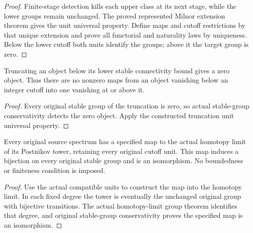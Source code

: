 \begin{proof}
  Finite-stage detection kills each upper class at its next stage, while the lower groups remain unchanged. The proved represented Milnor extension theorem gives the unit universal property. Define maps and cutoff restrictions by that unique extension and prove all functorial and naturality laws by uniqueness. Below the lower cutoff both units identify the groups; above it the target group is zero.
  \leanok
\end{proof}

\begin{proposition}
  \label{prop:actual-postnikov-degree-orthogonality}
  \leanok
  Truncating an object below its lower stable connectivity bound gives a zero object. Thus there are no nonzero maps from an object vanishing below an integer cutoff into one vanishing at or above it.
\end{proposition}
\begin{proof}
  Every original stable group of the truncation is zero, so actual stable-group conservativity detects the zero object. Apply the constructed truncation unit universal property.
  \leanok
\end{proof}

\begin{proposition}
  \label{prop:actual-postnikov-convergence}
  \leanok
  Every original source spectrum has a specified map to the actual homotopy limit of its Postnikov tower, retaining every original cutoff unit. This map induces a bijection on every original stable group and is an isomorphism. No boundedness or finiteness condition is imposed.
\end{proposition}
\begin{proof}
  Use the actual compatible units to construct the map into the homotopy limit. In each fixed degree the tower is eventually the unchanged original group with bijective transitions. The actual homotopy-limit group theorem identifies that degree, and original stable-group conservativity proves the specified map is an isomorphism.
  \leanok
\end{proof}

